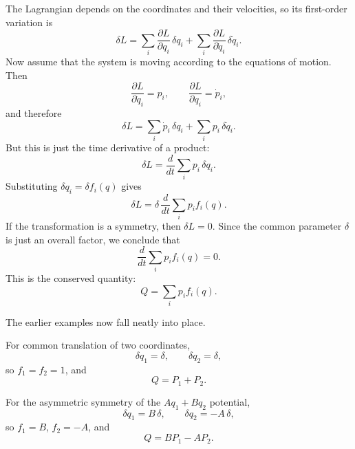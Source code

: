 The Lagrangian depends on the coordinates and their velocities, so its first-order variation is
\begin{equation}
\delta L
=
\sum_i \frac{\partial L}{\partial q_i}\,\delta q_i
+
\sum_i \frac{\partial L}{\partial \dot q_i}\,\delta\dot q_i.
\end{equation}
Now assume that the system is moving according to the equations of motion. Then
\begin{equation}
\frac{\partial L}{\partial \dot q_i}=p_i,
\qquad
\frac{\partial L}{\partial q_i}=\dot p_i,
\end{equation}
and therefore
\begin{equation}
\delta L
=
\sum_i \dot p_i\,\delta q_i
+
\sum_i p_i\,\delta\dot q_i.
\end{equation}
But this is just the time derivative of a product:
\begin{equation}
\delta L
=
\frac{d}{dt}\sum_i p_i\,\delta q_i.
\end{equation}
Substituting \(\delta q_i=\delta f_i(q)\) gives
\begin{equation}
\delta L
=
\delta\,\frac{d}{dt}\sum_i p_i f_i(q).
\end{equation}
If the transformation is a symmetry, then \(\delta L=0\). Since the common parameter \(\delta\) is just an overall factor, we conclude that
\begin{equation}
\frac{d}{dt}\sum_i p_i f_i(q)=0.
\end{equation}
This is the conserved quantity:
\begin{equation}
Q=\sum_i p_i f_i(q).
\end{equation}

The earlier examples now fall neatly into place.

For common translation of two coordinates,
\begin{equation}
\delta q_1=\delta,
\qquad
\delta q_2=\delta,
\end{equation}
so \(f_1=f_2=1\), and
\begin{equation}
Q=P_1+P_2.
\end{equation}

For the asymmetric symmetry of the \(Aq_1+Bq_2\) potential,
\begin{equation}
\delta q_1=B\,\delta,
\qquad
\delta q_2=-A\,\delta,
\end{equation}
so \(f_1=B\), \(f_2=-A\), and
\begin{equation}
Q=BP_1-AP_2.
\end{equation}

